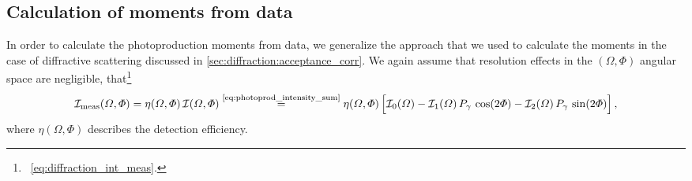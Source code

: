 \subsection{Calculation of moments from data}%
\label{sec:photoprod:moments_data}

In order to calculate the photoproduction moments from data, we
generalize the approach that we used to calculate the moments in the
case of diffractive scattering discussed in
\cref{sec:diffraction:acceptance_corr}.  We again assume that
resolution effects in the $(\Omega, \Phi)$ angular space are
negligible, \ie that\footnote{\Confer\
\cref{eq:diffraction_int_meas}.}
\begin{equation}
  \label{eq:photoprod_intensity_meas}
  \intensity_\text{meas}(\Omega, \Phi)
  = \eta(\Omega, \Phi)\, \intensity(\Omega, \Phi)
  \equalUsing{\cref{eq:photoprod_intensity_sum}} \eta(\Omega, \Phi) \sBrk[2]{\intensity_0(\Omega)
  - \intensity_1(\Omega)\, P_\gamma\, \cos(2 \Phi)
  - \intensity_2(\Omega)\, P_\gamma\, \sin(2 \Phi)},
\end{equation}
where $\eta(\Omega, \Phi)$ describes the detection efficiency.

